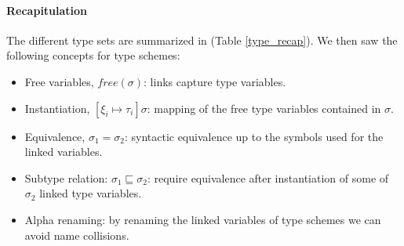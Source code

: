 \documentclass[a4paper]{report}
\newcommand{\reftab}[1]{(Table \ref{#1})}
\begin{document}
\paragraph{Recapitulation} The different type sets are summarized in \reftab{type_recap}. We then saw the following concepts for type schemes:
\begin{itemize}
\item Free variables, $free(\sigma)$: links capture type variables.
\item Instantiation, $\left[\xi_i\mapsto\tau_i\right]\sigma$: mapping of the free type variables contained in $\sigma$.
\item Equivalence, $\sigma_1 = \sigma_2$: syntactic equivalence up to the symbols used for the linked variables.
\item Subtype relation: $\sigma_1\sqsubseteq\sigma_2$: require equivalence after instantiation of some of $\sigma_2$ linked type variables.
\item Alpha renaming: by renaming the linked variables of type schemes we can avoid name collisions.
\end{itemize}
\end{document}
